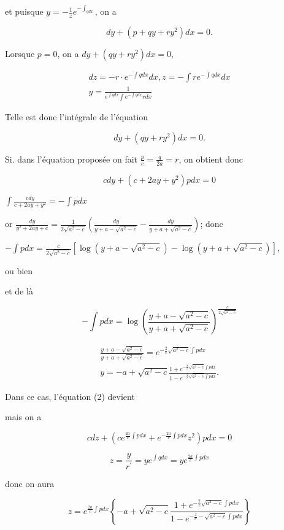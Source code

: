 \documentclass{article}
\begin{document}
et puisque \(y=-\frac{1}{z} e^{-\int_{q d x}}\), on a

\[
d y+\left(p+q y+r y^{2}\right) d x=0 .
\]

Lorsque \(p=0\), on a \(d y+\left(q y+r y^{2}\right) d x=0\),

\[
\begin{gathered}
d z=-r \cdot e^{-\int q d x} d x, z=-\int r e^{-\int q d x} d x \\
y=\frac{1}{e^{\int q d x} \int e^{-\int q d x} r d x}
\end{gathered}
\]

Telle est done l'intégrale de l'équation

\[
d y+\left(q y+r y^{2}\right) d x=0 .
\]

Si. dans l'équation proposée on fait \(\frac{p}{c}=\frac{q}{2 a}=r\), on obtient
donc

\[
c d y+\left(c+2 a y+y^{2}\right) p d x=0
\]

\(\int \frac{c d y}{c+2 a y+y^{2}}=-\int p d x\)

or \(\frac{d y}{y^{2}+2 a y+c}=\frac{1}{2 \sqrt{a^{2}-c}}\left(\frac{d y}{y+a-\sqrt{a^{2}-c}}-\frac{d y}{y+a+\sqrt{a^{2}-c}}\right)\); donc

\(-\int p d x=\frac{c}{2 \sqrt{a^{8}-c}}\left[\log \left(y+a-\sqrt{a^{2}-c}\right)-\log \left(y+a+\sqrt{a^{2}-c}\right)\right]\),

ou bien

et de là

\[
-\int p d x=\log \left(\frac{y+a-\sqrt{a^{2}-c}}{y+a+\sqrt{a^{2}-c}}\right)^{\frac{c}{2 \sqrt{a^{2}-c}}}
\]

\[
\begin{gathered}
\frac{y+a-\sqrt{a^{2}-c}}{y+a+\sqrt{a^{2}-c}}=e^{-\frac{2}{c} \sqrt{a^{2}-c} \int p d x} \\
y=-a+\sqrt{a^{2}-c} \frac{1+e^{-\frac{8}{c} \sqrt{a^{2}-c} \int p d x}}{1-e^{-\frac{2}{c} \sqrt{a^{2}-c} \int p d x}} .
\end{gathered}
\]

Dans ce cas, l'équation (2) devient

mais on a

\[
c d z+\left(c e^{\frac{2 a}{c} \int p d x}+e^{-\frac{2 a}{c} \int p d x} z^{2}\right) p d x=0
\]

\[
z=\frac{y}{r^{\prime}}=y e^{\int q d x}=y e^{\frac{2 a}{c} \int p d x}
\]

donc on aura

\[
z=e^{\frac{2 a}{c} \int p d x}\left\{-a+\sqrt{a^{2}-c} \frac{1+e^{-\frac{2}{c} \sqrt{a^{2}-c} \int p d x}}{1-e^{-\frac{z}{c}-\sqrt{a^{2}-c} \int p d x}}\right\}
\]
\end{document}
